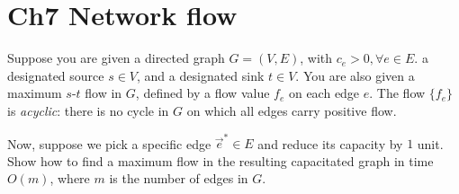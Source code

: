 \documentclass[11pt]{article}
\theoremstyle{numberplain}
\theoremstyle{nonumberplain}
\newcommand{\0}{{\mathbf{0}}}
\begin{document}
\section{Ch7 Network flow}
\begin{ques}[HW5, 7-10]
Suppose you are given a directed graph $G = (V,E)$, with
$c_e>0,\forall e\in E$.
a designated source $s \in V$, and a designated sink $t \in V$.
You are also given a maximum $s$-$t$ flow in $G$,
defined by a flow value $f_e$ on each edge $e$.
The flow $\{f_e\}$ is {\em acyclic}: there is
no cycle in $G$ on which all edges carry positive flow.
\par 
Now, suppose we pick a specific edge $\vec{e}^* \in E$
and reduce its capacity by $1$ unit.
Show how to find a maximum flow in the resulting
capacitated graph in time $O(m)$,
where $m$ is the number of edges in $G$.
\end{ques}
\end{document}
